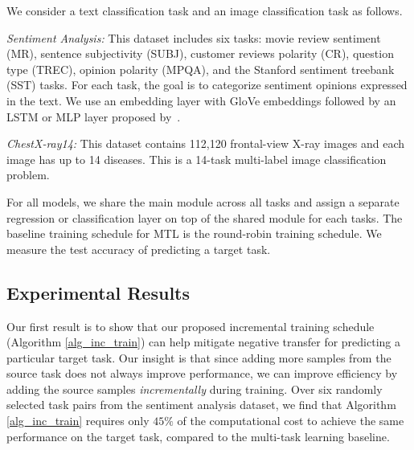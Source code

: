 We consider a text classification task and an image classification task as follows.

{\it Sentiment Analysis:} This dataset includes six tasks: movie review sentiment (MR), sentence subjectivity (SUBJ), customer reviews polarity (CR), question type (TREC), opinion polarity (MPQA), and the Stanford sentiment treebank (SST) tasks.
{For each task, the goal is to categorize sentiment opinions expressed in the text.
We use an embedding layer with GloVe embeddings
followed by an LSTM or MLP layer proposed by~\cite{lei2018simple}.
}

{\it ChestX-ray14:} This dataset contains 112,120 frontal-view X-ray images and each image has up to 14 diseases.
This is a 14-task multi-label image classification problem.


For all models, we share the main module across all tasks and assign a separate regression or classification layer on top of the shared module for each tasks.
The baseline training schedule for MTL is the round-robin training schedule.
We measure the test accuracy of predicting a target task.


\subsection{Experimental Results}

Our first result is to show that our proposed incremental training schedule (Algorithm \ref{alg_inc_train}) can help mitigate negative transfer for predicting a particular target task.
Our insight is that since adding more samples from the source task does not always improve performance, we can improve efficiency by adding the source samples \textit{incrementally} during training.
Over six randomly selected task pairs from the sentiment analysis dataset, we find that Algorithm \ref{alg_inc_train} requires only $45\%$ of the computational cost to achieve the same performance on the target task, compared to the multi-task learning baseline.

